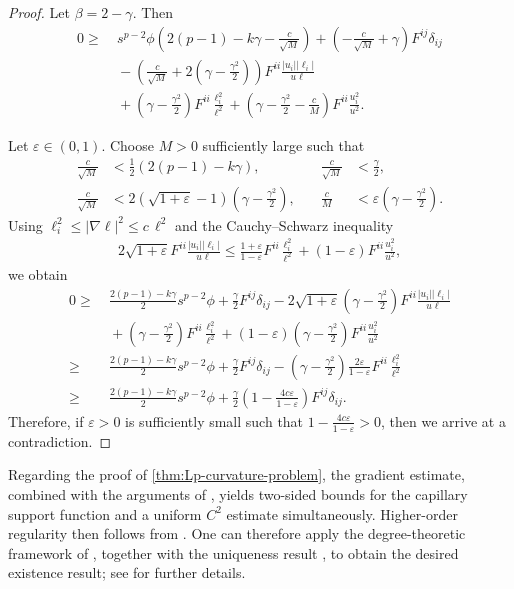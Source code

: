 \documentclass[12pt]{amsart}
\numberwithin{equation}{section}
\newcommand{\8}{\infty}
\newcommand{\de}{\delta}
\newcommand{\eq}[1]{\begin{equation}\begin{alignedat}{2}#1\end{alignedat}\end{equation}}
\begin{document}
\begin{proof}
Let $\beta=2-\gamma$. Then
\eq{
0\geq &~s^{p-2}\phi\left( 2(p-1)-k\gamma-\frac{c}{\sqrt{M}} \right)
+\left( -\frac{c}{\sqrt{M}}+\gamma\right)F^{ij}\de_{ij}\\
&~-\left(\frac{c}{\sqrt{M}}+2(\gamma-\frac{\gamma^2}{2})\right)F^{ii}\frac{|u_i||\ell_i|}{u\ell}\\
&~+\left(\gamma-\frac{\gamma^2}{2}\right)F^{ii}\frac{\ell_i^2}{\ell^2}
+\left(\gamma-\frac{\gamma^2}{2}-\frac{c}{M}\right)F^{ii}\frac{u_i^2}{u^2}.
}

Let $\varepsilon\in (0,1)$. Choose $M>0$ sufficiently large such that
\begin{equation}
\begin{alignedat}{2}
\frac{c}{\sqrt{M}}&<\frac{1}{2}\left(2(p-1)-k\gamma\right),\quad
&\frac{c}{\sqrt{M}}&<\frac{\gamma}{2},\\
\frac{c}{\sqrt{M}}&<2(\sqrt{1+\varepsilon}-1)\left(\gamma-\frac{\gamma^2}{2}\right),\quad
&\frac{c}{M}&<\varepsilon\left(\gamma-\frac{\gamma^2}{2}\right).
\end{alignedat}
\end{equation}
Using $\ell_i^2\leq |\nabla\ell|^2 \leq c\,\ell^2$ and the Cauchy--Schwarz inequality
\eq{
2\sqrt{1+\varepsilon} F^{ii}\frac{|u_i||\ell_i|}{u\ell}
\leq \frac{1+\varepsilon}{1-\varepsilon} F^{ii}\frac{\ell_i^2}{\ell^2}
+(1-\varepsilon)F^{ii}\frac{u_i^2}{u^2},
}
we obtain
\eq{
0\geq &~\frac{2(p-1)-k\gamma}{2}s^{p-2}\phi+\frac{\gamma}{2}F^{ij}\de_{ij}
-2\sqrt{1+\varepsilon}\left(\gamma-\frac{\gamma^2}{2}\right)F^{ii}\frac{|u_i||\ell_i|}{u\ell}\\
&~+\left(\gamma-\frac{\gamma^2}{2}\right)F^{ii}\frac{\ell_i^2}{\ell^2}
+(1-\varepsilon)\left(\gamma-\frac{\gamma^2}{2}\right)F^{ii}\frac{u_i^2}{u^2}\\
\geq &~\frac{2(p-1)-k\gamma}{2}s^{p-2}\phi+\frac{\gamma}{2}F^{ij}\de_{ij}
-\left(\gamma-\frac{\gamma^2}{2}\right)\frac{2\varepsilon}{1-\varepsilon}F^{ii}\frac{\ell_i^2}{\ell^2}\\
\geq &~\frac{2(p-1)-k\gamma}{2}s^{p-2}\phi+\frac{\gamma}{2}\left(1-\frac{4c\varepsilon}{1-\varepsilon}\right)F^{ij}\de_{ij}.
}
Therefore, if $\varepsilon>0$ is sufficiently small such that $1-\frac{4c\varepsilon}{1-\varepsilon}>0$, then we arrive at a contradiction.
\end{proof}


Regarding the proof of \autoref{thm:Lp-curvature-problem}, the gradient estimate, combined with the arguments of \cite{MWW25d}, yields two-sided bounds for the capillary support function and a uniform $C^2$ estimate simultaneously. Higher-order regularity then follows from \cite{Lie13}. One can therefore apply the degree-theoretic framework of \cite{LLN17}, together with the uniqueness result \cite[Thm. 1.6]{GL24}, to obtain the desired existence result; see \cite{MWW25d} for further details.
\end{document}
